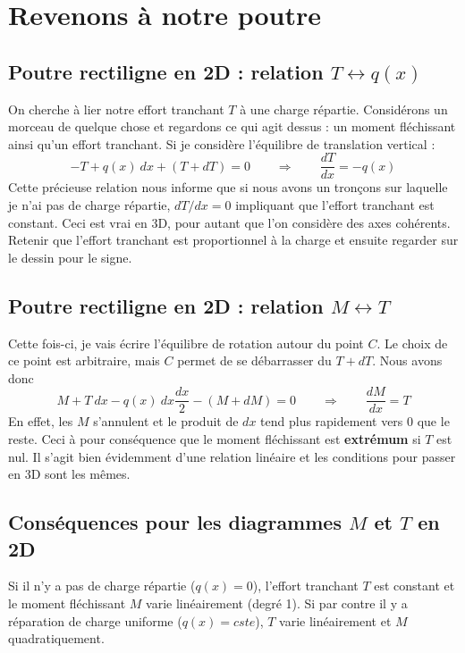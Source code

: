 \section{Revenons à notre poutre}
	\subsection{Poutre rectiligne en 2D : relation $T \leftrightarrow 
	q(x)$}
	On cherche à lier notre effort tranchant $T$ à une charge 
	répartie. Considérons un morceau de quelque chose et regardons ce 
	qui agit dessus : un moment fléchissant ainsi qu'un effort 
	tranchant. Si je considère l'équilibre de translation vertical :
	\begin{equation}
	-T + q(x)\ dx + (T+dT) = 0\qquad\Longrightarrow\qquad \dfrac{dT}{dx}
	=-q(x)
	\end{equation}
	Cette précieuse relation nous informe que si nous avons un tronçons 
	sur laquelle je n'ai pas de charge répartie, $dT/dx = 0$ impliquant 
	que l'effort tranchant est constant. Ceci est vrai en 3D, pour autant 
	que l'on considère des axes cohérents.\\
	\danger Retenir que l'effort tranchant est proportionnel à la charge 
	et ensuite regarder sur le dessin pour le signe.
	\subsection{Poutre rectiligne en 2D : relation $M \leftrightarrow T$}
	Cette fois-ci, je vais écrire l'équilibre de rotation autour du 
	point $C$. Le choix de ce point est arbitraire, mais $C$ permet de 
	se débarrasser du $T+dT$. Nous avons donc
	\begin{equation}
	M + T\ dx - q(x)\ dx \frac{dx}{2} - (M+dM)=0\qquad\Longrightarrow\qquad
	\dfrac{dM}{dx}= T
	\end{equation}
	En effet, les $M$ s'annulent et le produit de $dx$ tend plus rapidement 
	vers 0 que le reste. Ceci à pour conséquence que le moment fléchissant 
	est \textbf{extrémum} si $T$ est nul. Il s'agit bien évidemment d'une 
	relation linéaire et les conditions pour passer en 3D sont les mêmes.
	
	
	\subsection{Conséquences pour les diagrammes $M$ et $T$ en 2D}
	Si il n'y a pas de charge répartie ($q(x)=0$), l'effort tranchant $T$ est 
	constant et le moment fléchissant $M$ varie linéairement (degré 1). Si 
	par contre il y a réparation de charge uniforme ($q(x)=cste$), $T$ varie 
	linéairement et $M$ quadratiquement.\\
	
